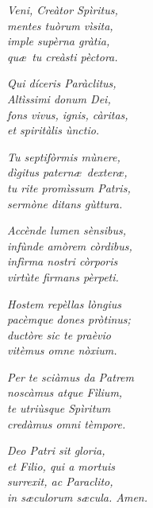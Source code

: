
\setcounter{numstrofa}{0}

\emph{\strofa Veni, Creàtor Spìritus,\\
mentes tuòrum vìsita,\\
imple supèrna gràtia,\\
qu\ae\ tu creàsti pèctora.}

\spazio

\emph{\strofa Qui díceris Paràclitus,\\
Altìssimi donum Dei,\\
fons vivus, ignis, càritas,\\
et spiritàlis ùnctio.}

\spazio

\emph{\strofa Tu septifòrmis mùnere,\\
dìgitus patern\ae\ dexter\ae,\\
tu rite promìssum Patris,\\
sermòne ditans gùttura.}

\spazio

\emph{\strofa Accènde lumen sènsibus,\\
infùnde amòrem còrdibus,\\
infìrma nostri còrporis\\
virtùte firmans pèrpeti.}

\spazio

\emph{\strofa Hostem repèllas lòngius\\
pacèmque dones pròtinus;\\
ductòre sic te praèvio\\
vitèmus omne nòxium.}

\spazio

\emph{\strofa Per te sciàmus da Patrem\\
noscàmus atque Fìlium,\\
te utriùsque Spìritum\\
credàmus omni tèmpore.}

\spazio

\emph{\strofa Deo Patri sit gloria,\\
et Filio, qui a mortuis\\
surrexit, ac Paraclito,\\
in s\ae culorum s\ae cula. Amen.}
